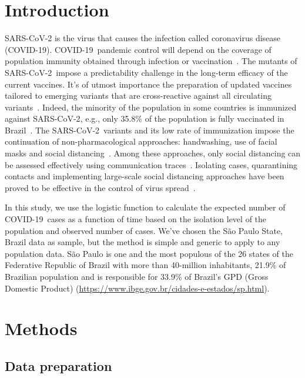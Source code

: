 \documentclass[review]{elsarticle}
\def\covid{\hbox{COVID-19}} %
\def\sarscov{{SARS-CoV-2}}
\begin{document}
\linenumbers

\section{Introduction}

SARS-CoV-2 is the virus that causes the infection 
called coronavirus disease (\covid). 
\covid\ pandemic control will depend 
on the coverage of population immunity obtained 
through infection or vaccination~\cite{WHOa}. 
The mutants of \sarscov\ impose a 
predictability challenge in the long-term efficacy 
of the current vaccines. 
 It's of utmost importance the preparation of updated 
 vaccines tailored to emerging variants that are cross-reactive 
 against all circulating variants~\cite{Harvey2021}. 
Indeed, the minority of the population in some countries 
is immunized against \sarscov, 
e.g., only 35.8\% of the population  
is fully vaccinated in Brazil~\cite{MH2021}.
The \sarscov\ variants and its low rate of immunization 
impose the continuation of non-pharmacological approaches: 
handwashing, use of facial masks and social distancing~\cite{WHOb}. 
Among these approaches, only social distancing 
can be assessed effectively using 
communication traces~\cite{Farrahi2014}. 
 Isolating cases, quarantining contacts and implementing
large-scale social distancing approaches have been proved to 
be effective in the control of virus spread~\cite{Aquino2020}.

In this study, we use the logistic function 
to calculate the expected number of \covid\ cases 
as a function of time
based 
on the isolation level of the population and 
observed number of cases. 
We've chosen the S\~{a}o Paulo State, Brazil data as sample, 
but the method is simple and generic 
to apply to any population data. 
S\~{a}o Paulo is one and the most populous of the 26 states 
of the Federative Republic of Brazil with 
more than 40-million inhabitants, 21.9\% 
of Brazilian population and is responsible for 33.9\% 
of Brazil's GPD (Gross Domestic Product) 
(\url{https://www.ibge.gov.br/cidades-e-estados/sp.html}).

\section{Methods}

\subsection{Data preparation}
\end{document}
